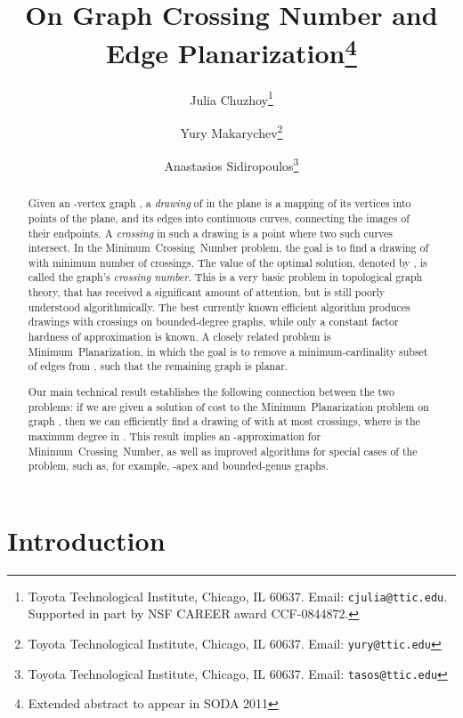 \documentclass[twoside,leqno,twocolumn]{article}
\newcommand{\MP}{\mbox{\sf Minimum Planarization}\xspace}
\newcommand{\MCN}{\mbox{\sf Minimum Crossing Number}\xspace}
\begin{document}
\title{\Large On Graph Crossing Number and Edge Planarization\iffull\footnote{Extended abstract to appear in SODA 2011}\fi}
\author{Julia Chuzhoy\thanks{Toyota Technological Institute, Chicago, IL
60637. Email: {\tt cjulia@ttic.edu}. Supported in part by NSF CAREER award CCF-0844872.}
 \and Yury Makarychev\thanks{Toyota Technological Institute, Chicago, IL
60637. Email: {\tt yury@ttic.edu}}\and Anastasios Sidiropoulos\thanks{Toyota Technological Institute, Chicago, IL
60637. Email: {\tt tasos@ttic.edu}}}
\date{}
\maketitle

\begin{abstract}
\ifabstract
\small\baselineskip=9pt\fi
Given an -vertex graph , a \emph{drawing} of  in the plane is a mapping of its vertices into points of the plane, and its edges into continuous curves, connecting the images of their endpoints. 
A \emph{crossing} in such a drawing is a point where two such curves intersect. In the \MCN problem, the goal is to find a drawing of  with minimum number of crossings. The value of the optimal solution, denoted by , is called the graph's \emph{crossing number}. This is a very basic problem in topological graph theory, that has received a significant amount of attention, but is still poorly understood algorithmically. The best currently known efficient algorithm produces drawings with   crossings on bounded-degree graphs, while only a constant factor hardness of approximation is known. A closely related problem is \MP, in which the goal is to remove a minimum-cardinality subset of edges from , such that the remaining graph is planar.

\ifabstract
\small\baselineskip=9pt\fi
Our main technical result establishes the following connection between the two problems: if we are given a solution of cost  to the \MP problem on graph , then we can efficiently find a drawing of  with at most  crossings, where  is the maximum degree in . This result implies an -approximation for \MCN, as well as improved algorithms for
special cases of the problem, such as, for example, -apex and bounded-genus graphs.
\end{abstract}

\section{Introduction}
\end{document}

